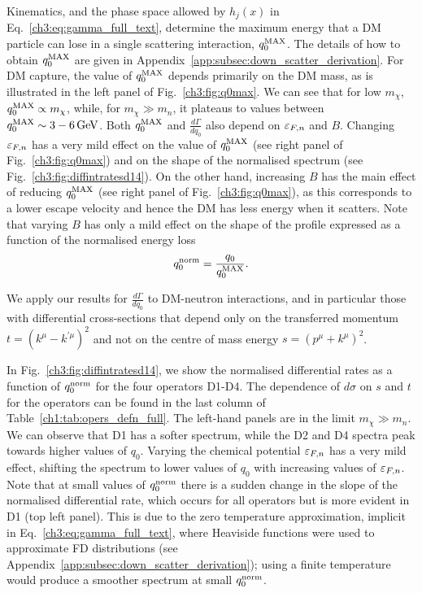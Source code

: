 Kinematics, and the phase space allowed by $h_j(x)$ in Eq.~\ref{ch3:eq:gamma_full_text}, determine the maximum energy that a DM particle can lose in a single scattering interaction, $q_0^{\rm MAX}$. The details of how to obtain $q_0^{\rm MAX}$ are given in Appendix~\ref{app:subsec:down_scatter_derivation}.
For DM capture, the value of $q_0^{\rm MAX}$ depends primarily on the DM mass, as is illustrated in the left panel of Fig.~\ref{ch3:fig:q0max}. We can see that for low $m_\chi$, $q_0^{\rm MAX}\propto m_\chi$, while, for $m_\chi\gg m_n$, it plateaus to values between $q_0^{\rm MAX}\sim 3 - 6 {\rm \,GeV}$. 
%
Both $q_0^{\rm MAX}$ and $\frac{d\Gamma}{dq_0}$ also depend on $\varepsilon_{F,n}$ and $B$. Changing $\varepsilon_{F,n}$ has a very mild effect on the value of $q_0^{\rm MAX}$ (see right panel of Fig.~\ref{ch3:fig:q0max}) and on the shape of the normalised spectrum (see Fig.~\ref{ch3:fig:diffintratesd14}). On the other hand, increasing $B$ has the main effect of reducing   $q_0^{\rm MAX}$ (see right panel of Fig.~\ref{ch3:fig:q0max}), as this corresponds to a lower escape velocity and hence the DM has less energy when it scatters. Note that varying $B$ has only a mild effect on the shape of the profile expressed as a function of the normalised energy loss 
\begin{equation}
    q_0^{\rm norm} = \frac{q_0}{q_0^{\rm MAX}}. 
\end{equation}

We apply our results for $\frac{d\Gamma}{d q_0}$ to DM-neutron interactions, and in particular those with differential cross-sections that depend only on the transferred momentum $t=(k^\mu-k^{'\mu})^2$ and not on the centre of mass energy $s=(p^\mu+k^\mu)^2$.

In Fig.~\ref{ch3:fig:diffintratesd14}, we show the normalised differential rates as a function of $q_0^{\rm norm}$ for the four operators D1-D4. The dependence of $d\sigma$ on $s$ and $t$ for the operators can be found in the last column of Table~\ref{ch1:tab:opers_defn_full}.  The left-hand panels are in the limit $m_\chi\gg m_n$. We can observe that D1 has a softer spectrum, while the D2 and D4 spectra peak towards higher values of $q_0$. Varying the chemical potential $\varepsilon_{F,n}$ has a very mild effect, shifting the spectrum to lower values of $q_0$ with increasing values of $\varepsilon_{F,n}$.
Note that at small values of $q_0^{\rm norm}$ there is a sudden change in the slope of the normalised differential rate, which occurs for all operators but is more evident in D1 (top left panel). This is due to the zero temperature approximation, implicit in Eq.~\ref{ch3:eq:gamma_full_text}, where Heaviside functions were used to approximate FD distributions (see Appendix~\ref{app:subsec:down_scatter_derivation}); using a finite temperature would produce a smoother spectrum at small $q_0^{\rm norm}$. 

